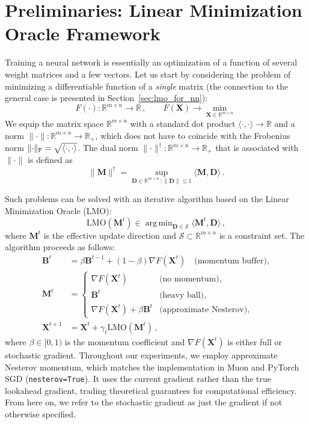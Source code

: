 \documentclass[a4paper,14pt,oneside]{extarticle}
\newcommand{\R}{\mathbb{R}} %
\newcommand{\norm}[1]{\lVert #1\rVert}
\DeclarePairedDelimiter{\normf}{\|}{\|_\mathrm{F}}
\def\<#1,#2>{\langle #1,#2\rangle}
\DeclareMathOperator*{\argmin}{arg\,min}
\newcommand{\Rmn}{\R^{m\times n}}
\newcommand{\mX}{\mathbf{X}}
\newcommand{\mM}{\mathbf{M}}
\newcommand{\mD}{\mathbf{D}}
\newcommand{\mB}{\mathbf{B}}
\newcommand{\cS}{\mathcal{S}}
\newcommand{\sectionref}[1]{Section~\ref{#1}}
\begin{document}
\section{Preliminaries: Linear Minimization Oracle Framework}

Training a neural network is essentially an optimization of a function of several weight matrices and a few vectors. Let us start by considering the problem of minimizing a differentiable function of a \emph{single} matrix (the connection to the general case is presented in \sectionref{sec:lmo_for_nn}):
\begin{equation}\label{eq:matrix_problem}
  F(\cdot)\colon \Rmn \to \R\,,\qquad F(\mX) \to \min_{\mX \in \Rmn}\,
\end{equation}
We equip the matrix space $\Rmn$ with a standard dot product $\<\cdot, \cdot> \to \R$ and a norm $\norm{\cdot}\colon \Rmn \to \R_+$, which does not have to coincide with the Frobenius norm $\normf{\cdot} = \sqrt{\<\cdot,\cdot>}$. The dual norm $\norm{\cdot}^\dagger\colon \Rmn \to \R_+$ that is associated with $\norm{\cdot}$ is defined as
\begin{equation}\label{eq:dual_norm}
  \norm{\mM}^\dagger = \sup_{\mD \in \Rmn\,:\norm{\mD}\leq 1} \<\mM,\mD>\,.
\end{equation}

Such problems can be solved with an iterative algorithm based on the Linear Minimization Oracle (LMO):
\begin{equation}\label{eq:lmo}
  \mathrm{LMO}(\mM^t) \in \argmin_{\mD \in \cS} \langle\mM^t, \mD\rangle\,,
\end{equation}
where $\mM^t$ is the effective update direction and $\cS \subset \Rmn$ is a constraint set. The algorithm proceeds as follows:
\begin{equation}\label{eq:simple_update}
  \begin{aligned}
  \mB^t &= \beta \mB^{t-1} + (1 - \beta) \nabla F(\mX^t) \quad \text{(momentum buffer)},\\
  \mM^t &= \begin{cases}
  \nabla F(\mX^t) & \text{(no momentum)},\\
  \mB^t & \text{(heavy ball)},\\
  \nabla F(\mX^t) + \beta \mB^t & \text{(approximate Nesterov)},
  \end{cases}\\
  \mX^{t + 1} &= \mX^t + \gamma_t\mathrm{LMO}\left(\mM^t\right)\,,
  \end{aligned}
\end{equation}
where $\beta \in [0, 1)$ is the momentum coefficient and $\nabla F(\mX^t)$ is either full or stochastic gradient. Throughout our experiments, we employ approximate Nesterov momentum, which matches the implementation in Muon and PyTorch SGD (\texttt{nesterov=True}). It uses the current gradient rather than the true lookahead gradient, trading theoretical guarantees for computational efficiency. From here on, we refer to the stochastic gradient as just the gradient if not otherwise specified.
\end{document}
